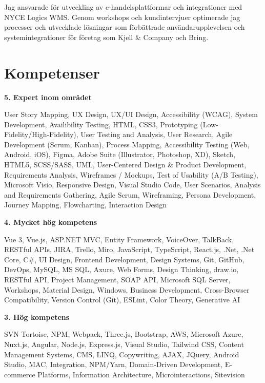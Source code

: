 \documentclass[a4paper,10pt]{article}
\begin{document}
Jag ansvarade för utveckling av e-handelsplattformar och integrationer med NYCE Logics WMS. Genom workshops och kundintervjuer optimerade jag processer och utvecklade lösningar som förbättrade användarupplevelsen och systemintegrationer för företag som Kjell \& Company och Bring.

\vspace{0.5cm}

\section*{Kompetenser}

\textbf{5. Expert inom området}

User Story Mapping, UX Design, UX/UI Design, Accessibility (WCAG), System Development, Availibility Testing, HTML, CSS3, Prototyping (Low-Fidelity/High-Fidelity), User Testing and Analysis, User Research, Agile Development (Scrum, Kanban), Process Mapping, Accessibility Testing (Web, Android, iOS), Figma, Adobe Suite (Illustrator, Photoshop, XD), Sketch, HTML5, SCSS/SASS, UML, User-Centered Design \& Product Development, Requirements Analysis, Wireframes / Mockups, Test of Usability (A/B Testing), Microsoft Visio, Responsive Design, Visual Studio Code, User Scenarios, Analysis and Requirements Gathering, Agile Scrum, Wireframing, Persona Development, Journey Mapping, Flowcharting, Interaction Design
\vspace{0.3cm}

\textbf{4. Mycket hög kompetens}

Vue 3, Vue.js, ASP.NET MVC, Entity Framework, VoiceOver, TalkBack, RESTful APIs, JIRA, Trello, Miro, JavaScript, TypeScript, React.js, .Net, .Net Core, C\#, UI Design, Frontend Development, Design Systems, Git, GitHub, DevOps, MySQL, MS SQL, Axure, Web Forms, Design Thinking, draw.io, RESTful API, Project Management, SOAP API, Microsoft SQL Server, Workshops, Material Design, Windows, Business Development, Cross-Browser Compatibility, Version Control (Git), ESLint, Color Theory, Generative AI
\vspace{0.5cm}

\textbf{3. Hög kompetens}

SVN Tortoise, NPM, Webpack, Three.js, Bootstrap, AWS, Microsoft Azure, Nuxt.js, Angular, Node.js, Express.js, Visual Studio, Tailwind CSS, Content Management Systems, CMS, LINQ, Copywriting, AJAX, JQuery, Android Studio, MAC, Integration, NPM/Yarn, Domain-Driven Development, E-commerce Platforms, Information Architecture, Microinteractions, Sitevision
\vspace{0.5cm}
\end{document}
